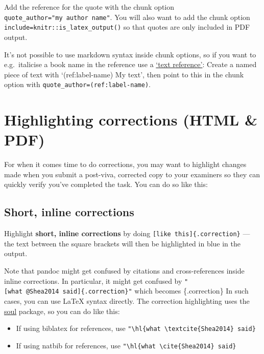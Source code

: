 \documentclass[a4paper, nobind]{templates/ociamthesis}
\providecommand{\tightlist}{%
  \setlength{\itemsep}{0pt}\setlength{\parskip}{0pt}}
\begin{document}
Add the reference for the quote with the chunk option \texttt{quote\_author="my\ author\ name"}.
You will also want to add the chunk option \texttt{include=knitr::is\_latex\_output()} so that quotes are only included in PDF output.

It's not possible to use markdown syntax inside chunk options, so if you want to e.g.~italicise a book name in the reference use a \href{https://bookdown.org/yihui/bookdown/markdown-extensions-by-bookdown.html\#text-references}{`text reference'}: Create a named piece of text with `(ref:label-name) My text', then point to this in the chunk option with \texttt{quote\_author=\textquotesingle{}(ref:label-name)\textquotesingle{}}.

\hypertarget{highlighting-corrections-html-pdf}{%
\section{Highlighting corrections (HTML \& PDF)}\label{highlighting-corrections-html-pdf}}

For when it comes time to do corrections, you may want to highlight changes made when you submit a post-viva, corrected copy to your examiners so they can quickly verify you've completed the task.
You can do so like this:

\hypertarget{short-inline-corrections}{%
\subsection{Short, inline corrections}\label{short-inline-corrections}}

Highlight \textbf{short, inline corrections} by doing \texttt{{[}like\ this{]}\{.correction\}} --- the text between the square brackets will then be highlighted in blue in the output.

Note that pandoc might get confused by citations and cross-references inside inline corrections.
In particular, it might get confused by \texttt{"{[}what\ @Shea2014\ said{]}\{.correction\}"} which becomes \autocite[what][ said]{Shea2014}\{.correction\}
In such cases, you can use LaTeX syntax directly.
The correction highlighting uses the \href{https://ctan.org/pkg/soul}{soul} package, so you can do like this:

\begin{itemize}
\tightlist
\item
  If using biblatex for references, use \texttt{"\textbackslash{}hl\{what\ \textbackslash{}textcite\{Shea2014\}\ said\}}
\item
  If using natbib for references, use \texttt{"\textbackslash{}hl\{what\ \textbackslash{}cite\{Shea2014\}\ said\}}
\end{itemize}
\end{document}
